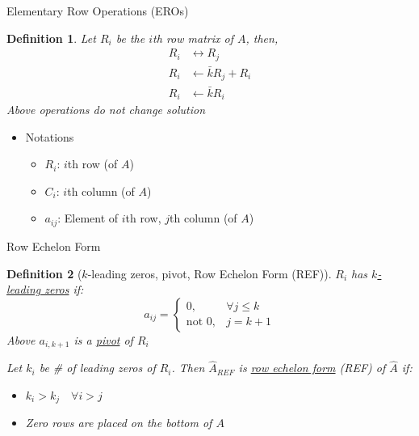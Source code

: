 \documentclass[final]{beamer}
\newtheorem{defn}{Definition}
\begin{document}
\begin{frame}[t]{Elementary Row Operations (EROs)}
	\begin{defn}
		Let $R_i$ be the $i$th row matrix of $A$, then, 
		\begin{align*}
			R_i &\leftrightarrow R_j \tag{$ERO_1(i,j)$}\\
			R_i &\leftarrow \bar k R_j + R_i \tag{$ERO_2(k,j,i)$}\\
			R_i &\leftarrow \bar k R_i \tag{$ERO_3(k,i)$}
		\end{align*}
		Above operations do not change solution
	\end{defn}
	\begin{itemize}
		\item Notations
		\begin{itemize}
			\item $R_i$: $i$th row (of $A$)
			\item $C_i$: $i$th column (of $A$)
			\item $a_{ij}$: Element of $i$th row, $j$th column (of $A$)
		\end{itemize}
	\end{itemize}
\end{frame}
\begin{frame}[t]{Row Echelon Form}
	\begin{defn}
		[$k$-leading zeros, pivot, Row Echelon Form (REF)]
		$R_i$ has \uline{$k$-leading zeros} if:
		\[
			a_{ij}=\begin{cases}
				0,&\forall j\le k\\
				\text{not } 0,& j=k+1
			\end{cases}
		\]
		Above $a_{i,k+1}$ is a \uline{pivot} of $R_i$ 
		
		Let $k_i$ be \# of leading zeros of $R_i$. Then $\hat A_{REF}$ is \uline{row echelon form} (REF) of $\hat A$ if:
		\begin{itemize}
			\item $k_i > k_j \quad\forall i>j$
			\item Zero rows are placed on the bottom of $A$
		\end{itemize}
	\end{defn}
\end{frame}
\end{document}

